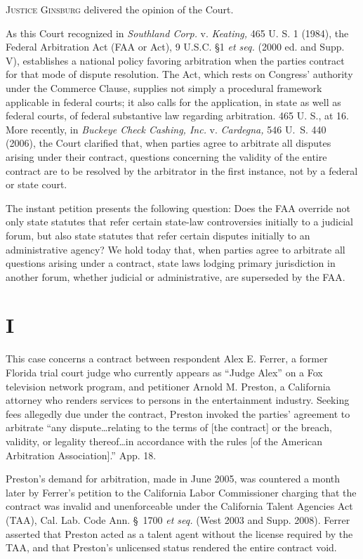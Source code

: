
\setcounter{page}{349}

  \textsc{Justice Ginsburg} delivered the opinion of the Court.

  As this Court recognized in \emph{Southland Corp.} v. \emph{Keating,}
465 U. S. 1 (1984), the Federal Arbitration Act (FAA or Act), 9
U.S.C. \S1 \emph{et seq.} (2000 ed. and Supp. V), establishes a national
policy favoring arbitration when the parties contract for that mode
of dispute resolution. The Act, which rests on Congress' authority
under the Commerce Clause, supplies not simply a procedural framework
applicable in federal courts; it also calls for the application, in
state as well as federal courts, of federal substantive law regarding
arbitration. 465 U. S., at 16. More recently, in \emph{Buckeye Check
Cashing, Inc.} v. \emph{Cardegna,} 546 U.~S. 440 (2006), the Court
clarified that, when parties agree to arbitrate all disputes arising
under their contract, questions concerning the validity of the entire
contract are to be resolved by the arbitrator in the first instance, not
by a federal or state court.

  The instant petition presents the following question: Does the
FAA override not only state statutes that refer certain state-law
controversies initially to a judicial forum, but also state statutes
that refer certain disputes initially to an administrative agency? We
hold today that, when parties agree to arbitrate all questions arising
under a contract, state laws lodging primary jurisdiction in another
forum, \newpage  whether judicial or administrative, are superseded by the
FAA.

\section{I}

  This case concerns a contract between respondent Alex E. Ferrer, a
former Florida trial court judge who currently appears as ``Judge
Alex'' on a Fox television network program, and petitioner Arnold
M. Preston, a California attorney who renders services to persons
in the entertainment industry. Seeking fees allegedly due under the
contract, Preston invoked the parties' agreement to arbitrate ``any
dispute\dots relating to the terms of [the contract] or the breach,
validity, or legality thereof\dots in accordance with the rules [of
the American Arbitration Association].'' App. 18.

  Preston's demand for arbitration, made in June 2005, was countered a
month later by Ferrer's petition to the California Labor Commissioner
charging that the contract was invalid and unenforceable under the
California Talent Agencies Act (TAA), Cal. Lab. Code Ann. \S~1700
\emph{et seq.} (West 2003 and Supp. 2008). Ferrer asserted that Preston
acted as a talent agent without the license required by the TAA, and
that Preston's unlicensed status rendered the entire contract void.
\footnotemark[1]

